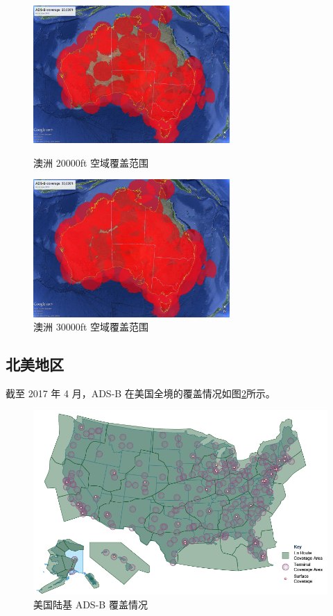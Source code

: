 \begin{figure}[!htb]
\centering
\begin{minipage}[t]{0.48\textwidth}
\centering
\includegraphics[width=7.5cm]{pic/ADS-B-20k.jpg}
\caption{澳洲 20000ft 空域覆盖范围}
\label{fig:ADS-B-20k}
\end{minipage}
\begin{minipage}[t]{0.48\textwidth}
\centering
\includegraphics[width=7.5cm]{pic/ADS-B-30k.jpg}
\caption{澳洲 30000ft 空域覆盖范围}
\label{fig:ADS-B-30k}
\end{minipage}
\end{figure}


\subsection{北美地区}

截至 2017 年 4 月，ADS-B 在美国全境的覆盖情况如图\ref{fig:ADS-B-Coverage-Area}所示。

\begin{figure}[!htb]
\centering
\includegraphics[width=14cm]{pic/ADS-B-Coverage-Area.png}
\caption{美国陆基 ADS-B 覆盖情况\protect\footnotemark}
\label{fig:ADS-B-Coverage-Area}
\end{figure}

